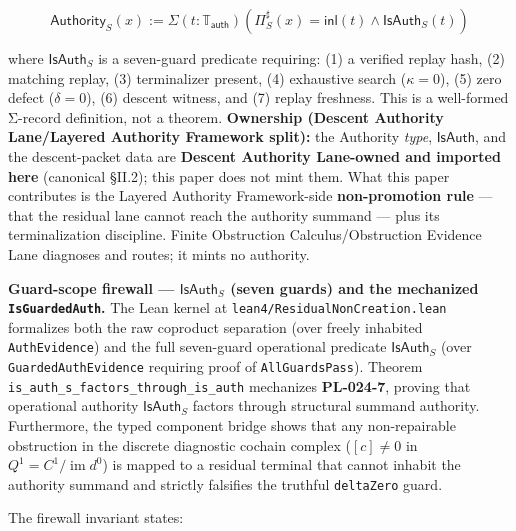 \documentclass[
  10pt,
]{article}
\renewenvironment{quote}
  {\begin{leftbar}\small}
  {\end{leftbar}}
\DeclareRobustCommand{\texttt}[1]{{\paperSymbolFont\nolinkurl{#1}}}
\begin{document}
\protect\hypertarget{math-E0032-0040}{}{\[\mathsf{Authority}_S(x) := \Sigma(t : \mathbb{T}_{\mathsf{auth}})(\Pi^\sharp_S(x) = \mathsf{inl}(t) \wedge \mathsf{IsAuth}_S(t))\]}

where \protect\hypertarget{math-E0033-0041}{}{\(\mathsf{IsAuth}_S\)} is a seven-guard predicate requiring: (1) a verified replay hash, (2) matching replay, (3) terminalizer present, (4) exhaustive search (\protect\hypertarget{math-E0034-0042}{}{\(\kappa = 0\)}), (5) zero defect (\protect\hypertarget{math-E0035-0043}{}{\(\delta = 0\)}), (6) descent witness, and (7) replay freshness. This is a well-formed Σ-record definition, not a theorem. \textbf{Ownership (Descent Authority Lane/Layered Authority Framework split):} the Authority \emph{type}, \protect\hypertarget{math-E0036-0044}{}{\(\mathsf{IsAuth}\)}, and the descent-packet data are \textbf{Descent Authority Lane-owned and imported here} (canonical §II.2); this paper does not mint them. What this paper contributes is the Layered Authority Framework-side \textbf{non-promotion rule} --- that the residual lane cannot reach the authority summand --- plus its terminalization discipline. Finite Obstruction Calculus/Obstruction Evidence Lane diagnoses and routes; it mints no authority.

\begin{quote}
\textbf{Guard-scope firewall --- \protect\hypertarget{math-E0033-0045}{}{\(\mathsf{IsAuth}_S\)} (seven guards) and the mechanized \texttt{IsGuardedAuth}.} The Lean kernel at \texttt{lean4/ResidualNonCreation.lean} formalizes both the raw coproduct separation (over freely inhabited \texttt{AuthEvidence}) and the full seven-guard operational predicate \protect\hypertarget{math-E0033-0046}{}{\(\mathsf{IsAuth}_S\)} (over \texttt{GuardedAuthEvidence} requiring proof of \texttt{AllGuardsPass}). Theorem \texttt{is\_auth\_s\_factors\_through\_is\_auth} mechanizes \textbf{PL-024-7}, proving that operational authority \protect\hypertarget{math-E0033-0047}{}{\(\mathsf{IsAuth}_S\)} factors through structural summand authority. Furthermore, the typed component bridge shows that any non-repairable obstruction in the discrete diagnostic cochain complex (\protect\hypertarget{math-E0037-0048}{}{\([c] \neq 0\)} in \protect\hypertarget{math-E0038-0049}{}{\(Q^1 = C^1 / \operatorname{im} d^0\)}) is mapped to a residual terminal that cannot inhabit the authority summand and strictly falsifies the truthful \texttt{deltaZero} guard.
\end{quote}

The firewall invariant states:
\end{document}
